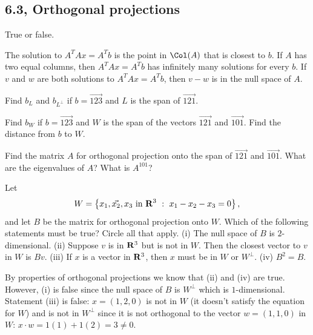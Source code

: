 \newpage

\subsection{6.3, Orthogonal projections}

\begin{problems}
\problem %
True or false.
\begin{subproblems}
    \subproblem The solution to $A^T A x = A^T b$ is the point in $\Col(A)$ that is closest to $b$.
    \subproblem If $A$ has two equal columns, then $A^TAx = A^Tb$ has infinitely many solutions for every $b$.
    \subproblem If $v$ and $w$ are both solutions to $A^TAx = A^Tb$, then $v-w$ is in the null space of $A$. %
\end{subproblems}

\problem %
Find $b_L$ and $b_{L^{\perp}}$ if $b = \vec{1 2 3}$ and $L$ is the span of $\vec{1 2 1}$.

\problem %
Find $b_W$ if $b = \vec{1 2 3}$ and $W$ is the span of the vectors $\vec{1 2 1}$ and $\vec{1 0 1}$.  Find the distance from $b$ to $W$.

\problem %
Find the matrix $A$ for orthogonal projection onto the span of $\vec{1 2 1}$ and $\vec{1 0 1}$.  What are the eigenvalues of $A$?  What is $A^{101}$?

\problem %
  Let
\[W = \left\{\vec{x_1, x_2, x_3} \textup{ in } {\bf R}^3 \ : \ x_1 -
    x_2 - x_3 = 0\right\},\] and let $B$ be the matrix for orthogonal
projection onto $W$.  Which of the following statements must be true?
Circle all that apply. %
\newline \newline %
(i) The null space of $B$ is $2$-dimensional. \newline \newline %
(ii) Suppose $v$ is in ${\bf R}^3$ but is not in $W$.  Then the
closest vector to $v$ in $W$ is $Bv$.  \newline \newline
(iii) If $x$ is a vector in ${\bf R}^3$, then $x$ must be in $W$ or
$W^{\perp}$.  \newline \newline %
(iv) $B^2 = B$.

\begin{solution}
  By properties of orthogonal projections we know that (ii) and (iv)
  are true. \newline \newline However, (i) is false since the null
  space of $B$ is $W^{\perp}$ which is $1$-dimensional.  Statement
  (iii) is false: $x = (1, 2, 0)$ is not in $W$ (it doesn't satisfy
  the equation for $W$) and is not in $W^{\perp}$ since it is not
  orthogonal to the vector $w = (1, 1, 0)$ in $W$:
  $x \cdot w = 1(1) + 1(2) = 3 \neq 0$.
\end{solution}


\end{problems}
